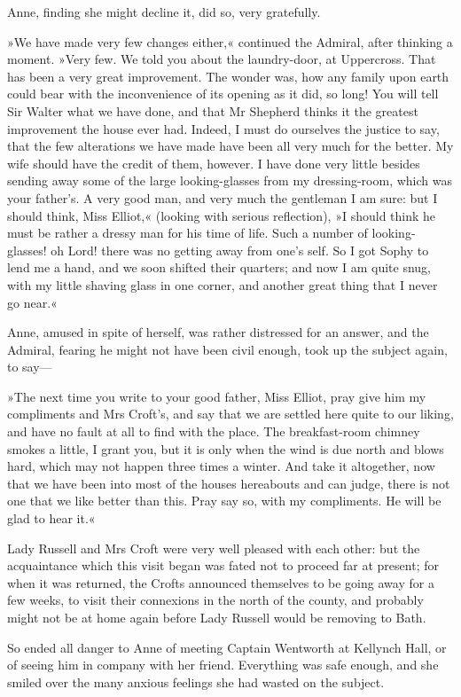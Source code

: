 Anne, finding she might decline it, did so, very gratefully.

»We have made very few changes either,« continued the Admiral, after thinking a moment. »Very few. We told you about the laundry-door, at Uppercross. That has been a very great improvement. The wonder was, how any family upon earth could bear with the inconvenience of its opening as it did, so long! You will tell Sir Walter what we have done, and that Mr Shepherd thinks it the greatest improvement the house ever had. Indeed, I must do ourselves the justice to say, that the few alterations we have made have been all very much for the better. My wife should have the credit of them, however. I have done very little besides sending away some of the large looking-glasses from my dressing-room, which was your father's. A very good man, and very much the gentleman I am sure: but I should think, Miss Elliot,« (looking with serious reflection), »I should think he must be rather a dressy man for his time of life. Such a number of looking-glasses! oh Lord! there was no getting away from one's self. So I got Sophy to lend me a hand, and we soon shifted their quarters; and now I am quite snug, with my little shaving glass in one corner, and another great thing that I never go near.«

Anne, amused in spite of herself, was rather distressed for an answer, and the Admiral, fearing he might not have been civil enough, took up the subject again, to say—

»The next time you write to your good father, Miss Elliot, pray give him my compliments and Mrs Croft's, and say that we are settled here quite to our liking, and have no fault at all to find with the place. The breakfast-room chimney smokes a little, I grant you, but it is only when the wind is due north and blows hard, which may not happen three times a winter. And take it altogether, now that we have been into most of the houses hereabouts and can judge, there is not one that we like better than this. Pray say so, with my compliments. He will be glad to hear it.«

Lady Russell and Mrs Croft were very well pleased with each other: but the acquaintance which this visit began was fated not to proceed far at present; for when it was returned, the Crofts announced themselves to be going away for a few weeks, to visit their connexions in the north of the county, and probably might not be at home again before Lady Russell would be removing to Bath.

So ended all danger to Anne of meeting Captain Wentworth at Kellynch Hall, or of seeing him in company with her friend. Everything was safe enough, and she smiled over the many anxious feelings she had wasted on the subject.